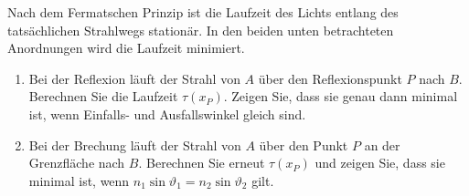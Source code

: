 \begin{ExerciseBlock}
Nach dem Fermatschen Prinzip ist die Laufzeit des Lichts entlang des tatsächlichen Strahlwegs stationär. In den beiden unten betrachteten Anordnungen wird die Laufzeit minimiert.
\begin{enumerate}
\item Bei der Reflexion läuft der Strahl von $A$ über den Reflexionspunkt $P$ nach $B$. Berechnen Sie die Laufzeit $\tau(x_P)$. Zeigen Sie, dass sie genau dann minimal ist, wenn Einfalls- und Ausfallswinkel gleich sind.
\begin{center}
\end{center}
\item Bei der Brechung läuft der Strahl von $A$ über den Punkt $P$ an der Grenzfläche nach $B$. Berechnen Sie erneut $\tau(x_P)$ und zeigen Sie, dass sie minimal ist, wenn $n_1\sin\vartheta_1=n_2\sin\vartheta_2$ gilt.
\begin{center}
\end{center}
\end{enumerate}
\end{ExerciseBlock}
